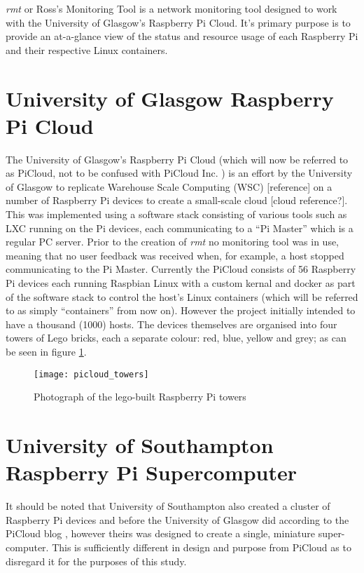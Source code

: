 \emph{rmt} or Ross's Monitoring Tool is a network monitoring tool 
designed to work with the University of Glasgow's Raspberry Pi 
Cloud. It's primary purpose is to provide an at-a-glance view of the 
status and resource usage of each Raspberry Pi and their respective 
Linux containers.

\section{University of Glasgow Raspberry Pi Cloud}
\label{intro:picloud}

The University of Glasgow's Raspberry Pi Cloud \citep{glapicloud, picloudblog} (which will now be 
referred to as PiCloud, not to be confused with PiCloud Inc. \citeyearpar{picloudinc}) is an effort by the University of Glasgow to replicate Warehouse Scale Computing (WSC) [reference] on a number of Raspberry Pi \citep{rasppi} devices to create a small-scale cloud [cloud reference?].
This was implemented using a software stack consisting of various tools such as LXC \citeyearpar{lxc}running on the Pi devices, each communicating to a ``Pi Master'' which is a regular PC server.
Prior to the creation of \emph{rmt} no monitoring tool was in use, meaning that no user feedback was received when, for example, a host stopped communicating to the Pi Master.
Currently the PiCloud consists of 56 Raspberry Pi devices each running Raspbian Linux \citeyearpar{raspbian} with a custom kernal and docker \citeyearpar{docker} as part of the software stack to control the host's Linux containers (which will be referred to as simply ``containers'' from now on).
However the project initially intended to have a thousand (1000) hosts.
The devices themselves are organised into four towers of Lego bricks, each a separate colour: red, blue, yellow and grey; as can be seen in figure \ref{fig:pitowers}.

\begin{figure}[t]
	\centering
	\texttt{[image: picloud\_towers]}
	\caption{Photograph of the lego-built Raspberry Pi towers}
	\label{fig:pitowers}
\end{figure}

\section{University of Southampton Raspberry Pi Supercomputer}
\label{intro:pisupercomp}

It should be noted that University of Southampton also created a cluster of Raspberry Pi devices and before the University of Glasgow did according to the PiCloud blog \citep{picloudblog}, however theirs was designed to create a single, miniature super-computer.
This is sufficiently different in design and purpose from PiCloud as to disregard it for the purposes of this study.
